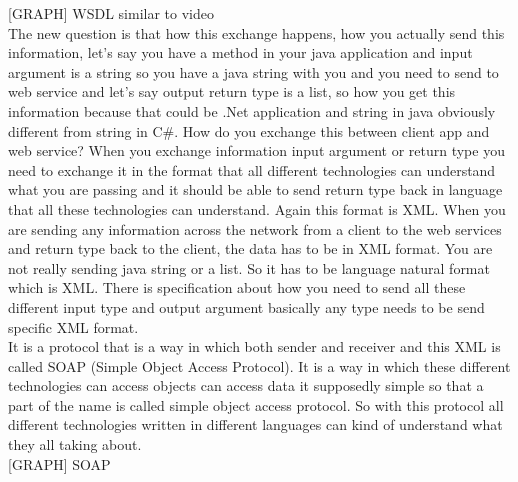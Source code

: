 [GRAPH] WSDL similar to video\\

The new question is that how this exchange happens, how you actually send this information, let’s say you have a method in
your java application and input argument is a string so you have a java string with you and you need to send to web service
and let’s say output return type is a list, so how you get this information because that could be .Net application and string
in java obviously different from string in C#. How do you exchange this between client app and web service?  When you exchange
information input argument or return type you need to exchange it in the format that all different technologies can understand
what you are passing and it should be able to send return type back in language that all these technologies can understand.
Again this format is XML. When you are sending any information across the network from a client to the web services and
return type back to the client, the data has to be in XML format. You are not really sending java string or a list. So it
has to be language natural format which is XML. There is specification about how you need to send all these different input
type and output argument basically any type needs to be send specific XML format.\\

It is a protocol that is a way in which both sender and receiver and this XML is called SOAP (Simple Object Access Protocol).
It is a way in which these different technologies can access objects can access data it supposedly simple so that a part
of the name is called simple object access protocol. So with this protocol all different technologies written in different
languages can kind of understand what they all taking about.\\

[GRAPH] SOAP\\

